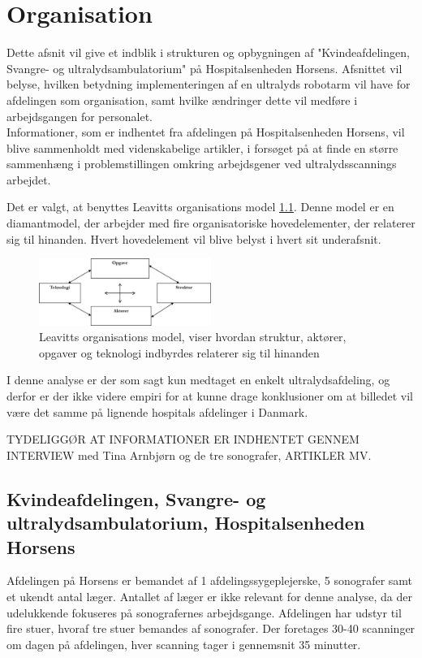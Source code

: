\chapter{Organisation}
Dette afsnit vil give et indblik i strukturen og opbygningen af "Kvindeafdelingen, Svangre- og ultralydsambulatorium" på Hospitalsenheden Horsens. Afsnittet vil belyse, hvilken betydning implementeringen af en ultralyds robotarm vil have for afdelingen som organisation, samt hvilke ændringer dette vil medføre i arbejdsgangen for personalet. \\
Informationer, som er indhentet fra afdelingen på Hospitalsenheden Horsens, vil blive sammenholdt med videnskabelige artikler, i forsøget på at finde en større sammenhæng i problemstillingen omkring arbejdsgener ved ultralydsscannings arbejdet.

Det er valgt, at benyttes Leavitts organisations model \ref{LeavittModel}. Denne model er en diamantmodel, der arbejder med fire organisatoriske hovedelementer, der relaterer sig til hinanden. Hvert hovedelement vil blive belyst i hvert sit underafsnit. 

\begin{figure}[h!]\centering
	\includegraphics[width = 0.5\textwidth]{Figurer/LeavittModel}
	\caption{Leavitts organisations model, viser hvordan struktur, aktører, opgaver og teknologi indbyrdes relaterer sig til hinanden}
	\label{LeavittModel}
\end{figure}
I denne analyse er der som sagt kun medtaget en enkelt ultralydsafdeling, og derfor er der ikke videre empiri for at kunne drage konklusioner om at billedet vil være det samme på lignende hospitals afdelinger i Danmark. 

TYDELIGGØR AT INFORMATIONER ER INDHENTET GENNEM INTERVIEW med Tina Arnbjørn og de tre sonografer, ARTIKLER MV.

\section{Kvindeafdelingen, Svangre- og ultralydsambulatorium, Hospitalsenheden Horsens}
Afdelingen på Horsens er bemandet af 1 afdelingssygeplejerske, 5 sonografer samt et ukendt antal læger. Antallet af læger er ikke relevant for denne analyse, da der udelukkende fokuseres på sonografernes arbejdsgange. Afdelingen har udstyr til fire stuer, hvoraf tre stuer bemandes af sonografer. Der foretages 30-40 scanninger om dagen på afdelingen, hver scanning tager i gennemsnit 35 minutter.

